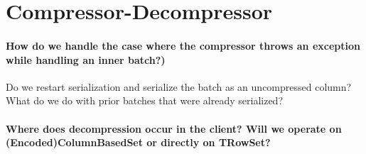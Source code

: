 \documentclass[11pt,a4paper]{article}
\begin{document}
\section{Compressor-Decompressor}
	\paragraph{How do we handle the case where the compressor throws an exception while handling an inner batch?)}
	Do we restart serialization and serialize the batch as an uncompressed column?
	What do we do with prior batches that were already serialized?
	
	\paragraph{Where does decompression occur in the client? Will we operate on (Encoded)ColumnBasedSet or directly on TRowSet?}
\end{document}
